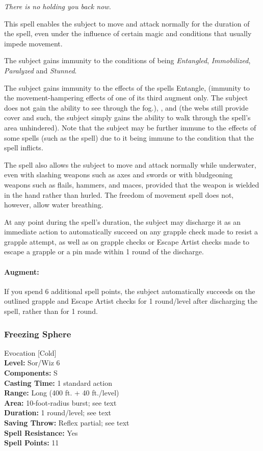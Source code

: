 \emph{There is no holding you back now.}

This spell enables the subject to move and attack normally for the duration of the spell, even under the influence of certain magic and conditions that usually impede movement.
\begin{list}{}{\leftmargin=1em}
 \item The subject gains immunity to the conditions of being \emph{Entangled}, \emph{Immobilized}, \emph{Paralyzed} and \emph{Stunned}.
 \item The subject gains immunity to the effects of the spells Entangle,  (immunity to the movement-hampering effects of one of its third augment only. 
 The subject does not gain the ability to see through the fog.), ,  and  
 (the webs still provide cover and such, the subject simply gains the ability to walk through the spell's area unhindered).
 Note that the subject may be further immune to the effects of some spells (such as the  spell) 
 due to it being immune to the condition that the spell inflicts.
\end{list}

The spell also allows the subject to move and attack normally while underwater, 
even with slashing weapons such as axes and swords or with bludgeoning weapons such as flails, 
hammers, and maces, provided that the weapon is wielded in the hand rather than hurled. 
The freedom of movement spell does not, however, allow water breathing.

At any point during the spell's duration, the subject may discharge it as an immediate action 
to automatically succeed on any grapple check made to resist a grapple attempt, 
as well as on grapple checks or Escape Artist checks made to escape a grapple or a pin made within 1 round of the discharge. 

\paragraph{Augment:} If you spend 6 additional spell points, the subject automatically succeeds on the outlined grapple and Escape Artist checks for 1 round/level after discharging the spell, 
 rather than for 1 round.
\subsubsection{Freezing Sphere}
\label{Spell:FreezingSphere}
Evocation [Cold]
\\ \textbf{Level:} Sor/Wiz 6
\\ \textbf{Components:} S
\\ \textbf{Casting Time:} 1 standard action
\\ \textbf{Range:} Long (400 ft. + 40 ft./level)
\\ \textbf{Area:} 10-foot-radius burst; see text
\\ \textbf{Duration:} 1 round/level; see text
\\ \textbf{Saving Throw:} Reflex partial; see text
\\ \textbf{Spell Resistance:} Yes
\\ \textbf{Spell Points:} 11

